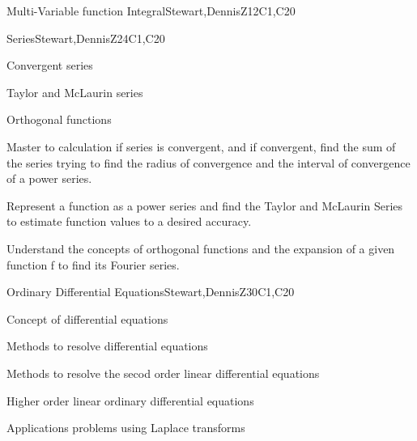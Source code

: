 \begin{syllabus}
\begin{unit}{Multi-Variable function Integral}{}{Stewart,DennisZ}{12}{C1,C20}
\begin{learningoutcomes}
    \end{learningoutcomes}

\end{unit}

\begin{unit}{Series}{}{Stewart,DennisZ}{24}{C1,C20}
   \begin{topics}
    \item Convergent series
    \item Taylor and McLaurin series
    \item Orthogonal functions 
 \end{topics}

   \begin{learningoutcomes}
    \item Master to calculation if series is convergent, and if convergent, find the sum of the series trying to find the radius of convergence and the interval of convergence of a power series.
    \item Represent a function as a power series and find the Taylor and McLaurin Series to estimate function values to a desired accuracy.
    \item Understand the concepts of orthogonal functions and the expansion of a given function f to find its Fourier series.
     \end{learningoutcomes}
\end{unit}

\begin{unit}{Ordinary Differential Equations}{}{Stewart,DennisZ}{30}{C1,C20}
   \begin{topics}
    \item Concept of differential equations
    \item Methods to resolve differential equations
    \item Methods to resolve the secod order linear differential equations 
    \item Higher order linear ordinary differential equations
    \item Applications problems using Laplace transforms
      \end{topics}


\end{unit}
\end{syllabus}
